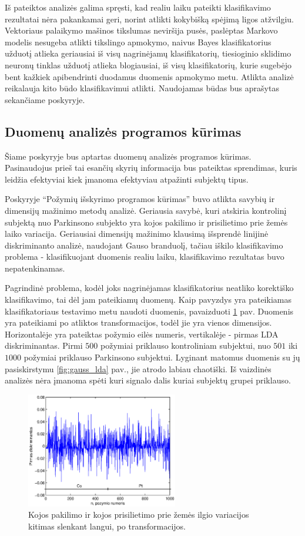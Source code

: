 \documentclass[]{vgtuef}
\begin{document}
Iš pateiktos analizės galima spręsti, kad realiu laiku pateikti klasifikavimo rezultatai nėra pakankamai geri, norint atlikti kokybišką spėjimą ligos atžvilgiu. Vektoriaus palaikymo mašinos tikslumas neviršija pusės, paslėptas Markovo modelis nesugeba atlikti tikslingo apmokymo, naivus Bayes klasifikatorius užduotį atlieka geriausiai iš visų nagrinėjamų klasifikatorių, tiesioginio sklidimo neuronų tinklas užduotį atlieka blogiausiai, iš visų klasifikatorių, kurie sugebėjo bent kažkiek apibendrinti duodamus duomenis apmokymo metu. Atlikta analizė reikalauja kito būdo klasifikavimui atlikti. Naudojamas būdas bus aprašytas sekančiame poskyryje.

\subsection{Duomenų analizės programos kūrimas}

Šiame poskyryje bus aptartas duomenų analizės programos kūrimas. Pasinaudojus prieš tai esančių skyrių informacija bus pateiktas sprendimas, kuris leidžia efektyviai kiek įmanoma efektyviau atpažinti subjektų tipus.

Poskyryje ``Požymių išskyrimo programos kūrimas'' buvo atlikta savybių ir dimensijų mažinimo metodų analizė. Geriausia savybė, kuri atskiria kontrolinį subjektą nuo Parkinsono subjekto yra kojos pakilimo ir prisilietimo prie žemės laiko variacija. Geriausiai dimensijų mažinimo klausimą išsprendė linijinė diskriminanto analizė, naudojant Gauso branduolį, tačiau iškilo klasifikavimo problema - klasifikuojant duomenis realiu laiku, klasifikavimo rezultatas buvo nepatenkinamas. 

Pagrindinė problema, kodėl joks nagrinėjamas klasifikatorius neatliko korektiško klasifikavimo, tai dėl jam pateikiamų duomenų. Kaip pavyzdys yra pateikiamas klasifikatoriaus testavimo metu naudoti duomenis, pavaizduoti \ref{fig:testing_sample} pav. Duomenis yra pateikiami po atliktos transformacijos, todėl jie yra vienos dimensijos. Horizontalėje yra pateiktas požymio eilės numeris, vertikalėje - pirmas LDA diskriminantas. Pirmi $500$ požymiai priklauso kontroliniam subjektui, nuo $501$ iki $1000$ požymiai priklauso Parkinsono subjektui. Lyginant matomus duomenis su jų pasiskirstymu \ref{fig:gauss_lda} pav., jie atrodo labiau chaotiški. Iš vaizdinės analizės nėra įmanoma spėti kuri signalo dalis kuriai subjektų grupei priklauso. 

\begin{figure}
	\centering
	\includegraphics[width=250px]{figures/11_sample_testing}
	\caption{Kojos pakilimo ir kojos prisilietimo prie žemės ilgio variacijos kitimas slenkant langui, po transformacijos.}
	\label{fig:testing_sample}
\end{figure}
\end{document}
